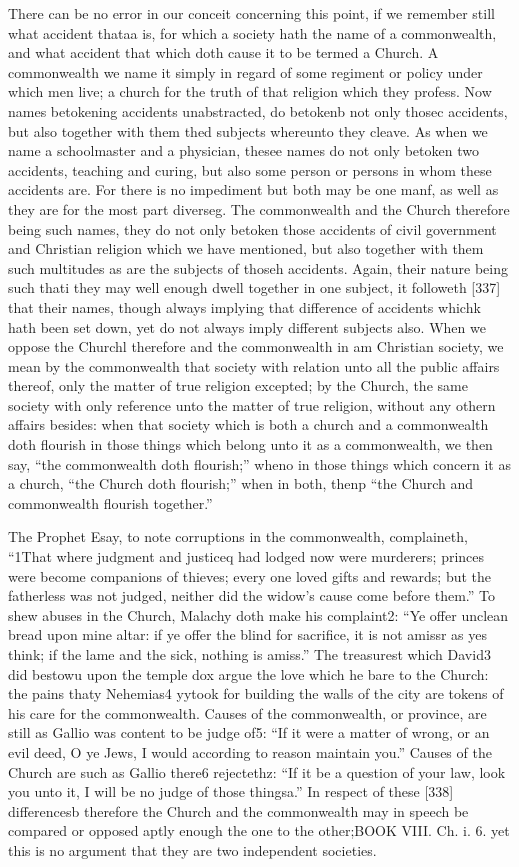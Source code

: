 There can be no error in our conceit concerning this point, if we remember still what accident thataa is, for which a society hath the name of a commonwealth, and what accident that which doth cause it to be termed a Church. A commonwealth we name it simply in regard of some regiment or policy under which men live; a church for the truth of that religion which they profess. Now names betokening accidents unabstracted, do betokenb not only thosec accidents, but also together with them thed subjects whereunto they cleave. As when we name a schoolmaster and a physician, thesee names do not only betoken two accidents, teaching and curing, but also some person or persons in whom these accidents are. For there is no impediment but both may be one manf, as well as they are for the most part diverseg. The commonwealth and the Church therefore being such names, they do not only betoken those accidents of civil government and Christian religion which we have mentioned, but also together with them such multitudes as are the subjects of thoseh accidents. Again, their nature being such thati they may well enough dwell together in one subject, it followeth [337] that their names, though always implying that difference of accidents whichk hath been set down, yet do not always imply different subjects also. When we oppose the Churchl therefore and the commonwealth in am Christian society, we mean by the commonwealth that society with relation unto all the public affairs thereof, only the matter of true religion excepted; by the Church, the same society with only reference unto the matter of true religion, without any othern affairs besides: when that society which is both a church and a commonwealth doth flourish in those things which belong unto it as a commonwealth, we then say, “the commonwealth doth flourish;” wheno in those things which concern it as a church, “the Church doth flourish;” when in both, thenp “the Church and commonwealth flourish together.”

The Prophet Esay, to note corruptions in the commonwealth, complaineth, “1That where judgment and justiceq had lodged now were murderers; princes were become companions of thieves; every one loved gifts and rewards; but the fatherless was not judged, neither did the widow’s cause come before them.” To shew abuses in the Church, Malachy doth make his complaint2: “Ye offer unclean bread upon mine altar: if ye offer the blind for sacrifice, it is not amissr as yes think; if the lame and the sick, nothing is amiss.” The treasurest which David3 did bestowu upon the temple dox argue the love which he bare to the Church: the pains thaty Nehemias4 yytook for building the walls of the city are tokens of his care for the commonwealth. Causes of the commonwealth, or province, are still as Gallio was content to be judge of5: “If it were a matter of wrong, or an evil deed, O ye Jews, I would according to reason maintain you.” Causes of the Church are such as Gallio there6 rejectethz: “If it be a question of your law, look you unto it, I will be no judge of those thingsa.” In respect of these [338] differencesb therefore the Church and the commonwealth may in speech be compared or opposed aptly enough the one to the other;BOOK VIII. Ch. i. 6. yet this is no argument that they are two independent societies.

